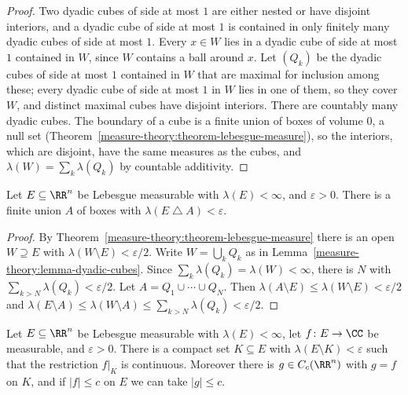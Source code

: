 \begin{proof}
Two dyadic cubes of side at most $1$ are either nested or have disjoint interiors, and a dyadic cube of side at most $1$ is contained in only finitely many
dyadic cubes of side at most $1$. Every $x \in W$ lies in a dyadic cube of side at most $1$ contained in $W$, since $W$ contains a ball around $x$. Let
$(Q_k)$ be the dyadic cubes of side at most $1$ contained in $W$ that are maximal for inclusion among these; every dyadic cube of side at most $1$ in $W$ lies in
one of them, so they cover $W$, and distinct maximal cubes have disjoint interiors. There are countably many dyadic cubes. The boundary of a cube is a
finite union of boxes of volume $0$, a null set (Theorem~\ref{measure-theory:theorem-lebesgue-measure}), so the interiors, which are disjoint, have the same
measures as the cubes, and $\lambda(W) = \sum_k\lambda(Q_k)$ by countable additivity.
\end{proof}

\begin{proposition}\label{measure-theory:proposition-approximation-boxes}
Let $E \subseteq \RR^n$ be Lebesgue measurable with $\lambda(E) < \infty$, and $\varepsilon > 0$. There is a finite union $A$ of boxes with
$\lambda(E \mathbin{\triangle} A) < \varepsilon$.
\end{proposition}

\begin{proof}
By Theorem~\ref{measure-theory:theorem-lebesgue-measure} there is an open $W \supseteq E$ with $\lambda(W \setminus E) < \varepsilon/2$. Write $W = \bigcup_kQ_k$ as in
Lemma~\ref{measure-theory:lemma-dyadic-cubes}. Since $\sum_k\lambda(Q_k) = \lambda(W) < \infty$, there is $N$ with $\sum_{k > N}\lambda(Q_k) < \varepsilon/2$. Let
$A = Q_1 \cup \cdots \cup Q_N$. Then $\lambda(A \setminus E) \leq \lambda(W \setminus E) < \varepsilon/2$ and
$\lambda(E \setminus A) \leq \lambda(W \setminus A) \leq \sum_{k > N}\lambda(Q_k) < \varepsilon/2$.
\end{proof}

\begin{theorem}[Lusin]\label{measure-theory:theorem-lusin}
Let $E \subseteq \RR^n$ be Lebesgue measurable with $\lambda(E) < \infty$, let $f \colon E \to \CC$ be measurable, and $\varepsilon > 0$. There is a compact set
$K \subseteq E$ with $\lambda(E \setminus K) < \varepsilon$ such that the restriction $f|_K$ is continuous. Moreover there is $g \in C_c(\RR^n)$ with $g = f$ on $K$,
and if $|f| \leq c$ on $E$ we can take $|g| \leq c$.
\end{theorem}

